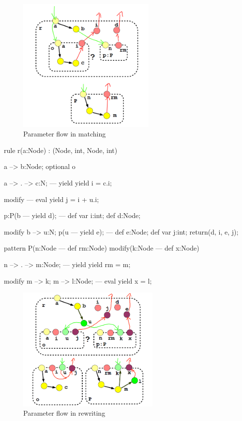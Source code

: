 \begin{figure}[hptb]
  \centering
  \includegraphics[width=0.61\textwidth]{fig/MatchAndParameterFlowAnnotated}
  \caption{Parameter flow in matching}
  \label{figmatchingparameterflow}
\end{figure}

\begin{example}
  \begin{grgen}
rule r(a:Node) : (Node, int, Node, int) {
  a --> b:Node;
  optional o {
    a --> . --> c:N;
  ---
    yield {	yield i = c.i; }

    modify {
    ---
      eval { yield j = i + u.i; }
    }
  }
  p:P(b --- yield d);
---	
  def var i:int;
  def d:Node;

  modify {
    b --> u:N;
    p(u --- yield e);
  ---
    def e:Node; def var j:int;
    return(d, i, e, j);
  }
}
pattern P(n:Node --- def rm:Node) modify(k:Node --- def x:Node) {
  n --> . --> m:Node;
---
  yield {	yield rm = m; }

  modify {
    m --> k; m --> l:Node;
  ---
    eval { yield x = l; }
  }
}
  \end{grgen}
\end{example}\label{exrewritingparameterflow}

\begin{figure}[hptb]
  \centering
  \includegraphics[width=0.63\textwidth]{fig/RewriteAndParameterFlowAnnotated}
  \caption{Parameter flow in rewriting}
  \label{figrewritingparameterflow}
\end{figure}

